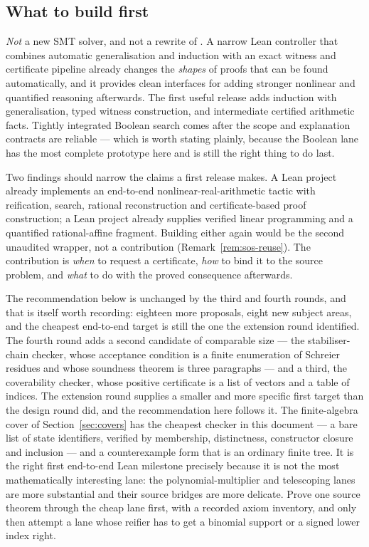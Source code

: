 \subsection{What to build first}

\emph{Not} a new SMT solver, and not a rewrite of \grind{}. A narrow Lean
controller that combines automatic generalisation and induction with an exact
witness and certificate pipeline already changes the \emph{shapes} of proofs
that can be found automatically, and it provides clean interfaces for adding
stronger nonlinear and quantified reasoning afterwards. The first useful release
adds induction with generalisation, typed witness construction, and intermediate
certified arithmetic facts. Tightly integrated Boolean search comes after the
scope and explanation contracts are reliable --- which is worth stating plainly,
because the Boolean lane has the most complete prototype here and is still the
right thing to do last.

Two findings should narrow the claims a first release makes. A Lean 
project already implements an end-to-end nonlinear-real-arithmetic tactic with
reification, search, rational reconstruction and certificate-based proof
construction; a Lean  project already supplies verified linear
programming and a quantified rational-affine fragment. Building either again
would be the second unaudited wrapper, not a contribution
(Remark~\ref{rem:sos-reuse}). The contribution is \emph{when} to request a
certificate, \emph{how} to bind it to the source problem, and \emph{what} to do
with the proved consequence afterwards.

The recommendation below is unchanged by the third and fourth rounds, and that
is itself worth recording: eighteen more proposals, eight new subject areas,
and the cheapest end-to-end target is still the one the extension round
identified. The fourth round adds a second candidate of comparable size ---
the stabiliser-chain checker, whose acceptance condition is a finite
enumeration of Schreier residues and whose soundness theorem is three
paragraphs --- and a third, the coverability checker, whose positive
certificate is a list of vectors and a table of indices. The
extension round supplies a smaller and more specific first target than the
design round did, and the recommendation here follows it. The finite-algebra
cover of Section~\ref{sec:covers} has the cheapest checker in this document ---
a bare list of state identifiers, verified by membership, distinctness,
constructor closure and inclusion --- and a counterexample form that is an
ordinary finite tree. It is the right first end-to-end Lean milestone precisely
because it is not the most mathematically interesting lane: the
polynomial-multiplier and telescoping lanes are more substantial and their
source bridges are more delicate. Prove one source theorem through the cheap
lane first, with a recorded axiom inventory, and only then attempt a lane whose
reifier has to get a binomial support or a signed lower index right.

